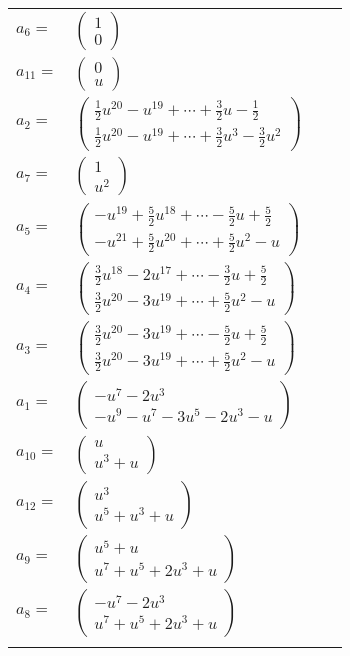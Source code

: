 \documentclass[1p]{elsarticle_modified}
\theoremstyle{definition}
\begin{document}
\begin{tabular}{m{7pt} m{180pt} m{7pt} m{180pt} }
\flushright $a_{6}=$&$\begin{pmatrix}1\\0\end{pmatrix}$ \\
\flushright $a_{11}=$&$\begin{pmatrix}0\\u\end{pmatrix}$ \\
\flushright $a_{2}=$&$\begin{pmatrix}\frac{1}{2} u^{20}- u^{19}+\cdots+\frac{3}{2} u-\frac{1}{2}\\\frac{1}{2} u^{20}- u^{19}+\cdots+\frac{3}{2} u^3-\frac{3}{2} u^2\end{pmatrix}$ \\
\flushright $a_{7}=$&$\begin{pmatrix}1\\u^2\end{pmatrix}$ \\
\flushright $a_{5}=$&$\begin{pmatrix}- u^{19}+\frac{5}{2} u^{18}+\cdots-\frac{5}{2} u+\frac{5}{2}\\- u^{21}+\frac{5}{2} u^{20}+\cdots+\frac{5}{2} u^2- u\end{pmatrix}$ \\
\flushright $a_{4}=$&$\begin{pmatrix}\frac{3}{2} u^{18}-2 u^{17}+\cdots-\frac{3}{2} u+\frac{5}{2}\\\frac{3}{2} u^{20}-3 u^{19}+\cdots+\frac{5}{2} u^2- u\end{pmatrix}$ \\
\flushright $a_{3}=$&$\begin{pmatrix}\frac{3}{2} u^{20}-3 u^{19}+\cdots-\frac{5}{2} u+\frac{5}{2}\\\frac{3}{2} u^{20}-3 u^{19}+\cdots+\frac{5}{2} u^2- u\end{pmatrix}$ \\
\flushright $a_{1}=$&$\begin{pmatrix}- u^7-2 u^3\\- u^9- u^7-3 u^5-2 u^3- u\end{pmatrix}$ \\
\flushright $a_{10}=$&$\begin{pmatrix}u\\u^3+u\end{pmatrix}$ \\
\flushright $a_{12}=$&$\begin{pmatrix}u^3\\u^5+u^3+u\end{pmatrix}$ \\
\flushright $a_{9}=$&$\begin{pmatrix}u^5+u\\u^7+u^5+2 u^3+u\end{pmatrix}$ \\
\flushright $a_{8}=$&$\begin{pmatrix}- u^7-2 u^3\\u^7+u^5+2 u^3+u\end{pmatrix}$\\&\end{tabular}
\end{document}
